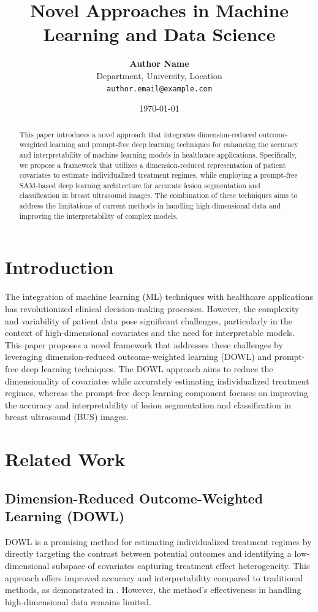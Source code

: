 \documentclass[12pt]{article}
\title{Novel Approaches in Machine Learning and Data Science}
\author{
    \textbf{Author Name}\\
    Department, University, Location\\
    \texttt{author.email@example.com}
}
\date{\today}
\begin{document}
\maketitle

\begin{abstract}
This paper introduces a novel approach that integrates dimension-reduced outcome-weighted learning and prompt-free deep learning techniques for enhancing the accuracy and interpretability of machine learning models in healthcare applications. Specifically, we propose a framework that utilizes a dimension-reduced representation of patient covariates to estimate individualized treatment regimes, while employing a prompt-free SAM-based deep learning architecture for accurate lesion segmentation and classification in breast ultrasound images. The combination of these techniques aims to address the limitations of current methods in handling high-dimensional data and improving the interpretability of complex models.
\end{abstract}

\section{Introduction}
The integration of machine learning (ML) techniques with healthcare applications has revolutionized clinical decision-making processes. However, the complexity and variability of patient data pose significant challenges, particularly in the context of high-dimensional covariates and the need for interpretable models. This paper proposes a novel framework that addresses these challenges by leveraging dimension-reduced outcome-weighted learning (DOWL) and prompt-free deep learning techniques. The DOWL approach aims to reduce the dimensionality of covariates while accurately estimating individualized treatment regimes, whereas the prompt-free deep learning component focuses on improving the accuracy and interpretability of lesion segmentation and classification in breast ultrasound (BUS) images.

\section{Related Work}
\subsection{Dimension-Reduced Outcome-Weighted Learning (DOWL)}
DOWL is a promising method for estimating individualized treatment regimes by directly targeting the contrast between potential outcomes and identifying a low-dimensional subspace of covariates capturing treatment effect heterogeneity. This approach offers improved accuracy and interpretability compared to traditional methods, as demonstrated in \cite{son2026dimensionreducedoutcomeweightedlearningestimating}. However, the method's effectiveness in handling high-dimensional data remains limited.
\end{document}
